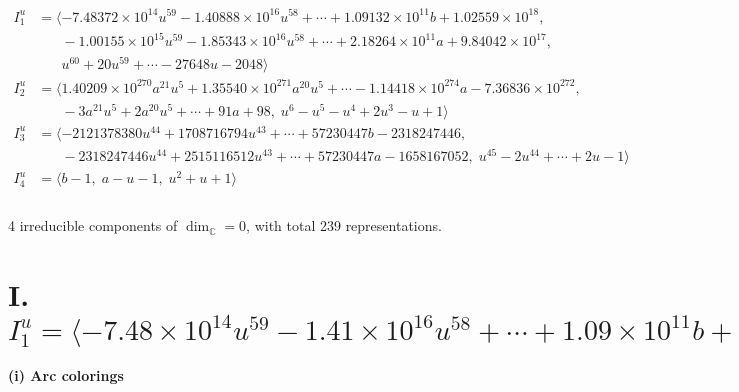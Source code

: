 \documentclass[1p]{elsarticle_modified}
\theoremstyle{definition}
\begin{document}
\begin{align*}
I^u_{1}&=\langle 
-7.48372\times10^{14} u^{59}-1.40888\times10^{16} u^{58}+\cdots+1.09132\times10^{11} b+1.02559\times10^{18},\\
\phantom{I^u_{1}}&\phantom{= \langle  }-1.00155\times10^{15} u^{59}-1.85343\times10^{16} u^{58}+\cdots+2.18264\times10^{11} a+9.84042\times10^{17},\\
\phantom{I^u_{1}}&\phantom{= \langle  }u^{60}+20 u^{59}+\cdots-27648 u-2048\rangle \\
I^u_{2}&=\langle 
1.40209\times10^{270} a^{21} u^{5}+1.35540\times10^{271} a^{20} u^{5}+\cdots-1.14418\times10^{274} a-7.36836\times10^{272},\\
\phantom{I^u_{2}}&\phantom{= \langle  }-3 a^{21} u^5+2 a^{20} u^5+\cdots+91 a+98,\;u^6- u^5- u^4+2 u^3- u+1\rangle \\
I^u_{3}&=\langle 
-2121378380 u^{44}+1708716794 u^{43}+\cdots+57230447 b-2318247446,\\
\phantom{I^u_{3}}&\phantom{= \langle  }-2318247446 u^{44}+2515116512 u^{43}+\cdots+57230447 a-1658167052,\;u^{45}-2 u^{44}+\cdots+2 u-1\rangle \\
I^u_{4}&=\langle 
b-1,\;a- u-1,\;u^2+u+1\rangle \\
\\
\end{align*}
\raggedright * 4 irreducible components of $\dim_{\mathbb{C}}=0$, with total 239 representations.\\
\newpage
\renewcommand{\arraystretch}{1}
\centering \section*{I. $I^u_{1}= \langle -7.48\times10^{14} u^{59}-1.41\times10^{16} u^{58}+\cdots+1.09\times10^{11} b+1.03\times10^{18},\;-1.00\times10^{15} u^{59}-1.85\times10^{16} u^{58}+\cdots+2.18\times10^{11} a+9.84\times10^{17},\;u^{60}+20 u^{59}+\cdots-27648 u-2048 \rangle$}
\flushleft \textbf{(i) Arc colorings}\\
\end{document}
